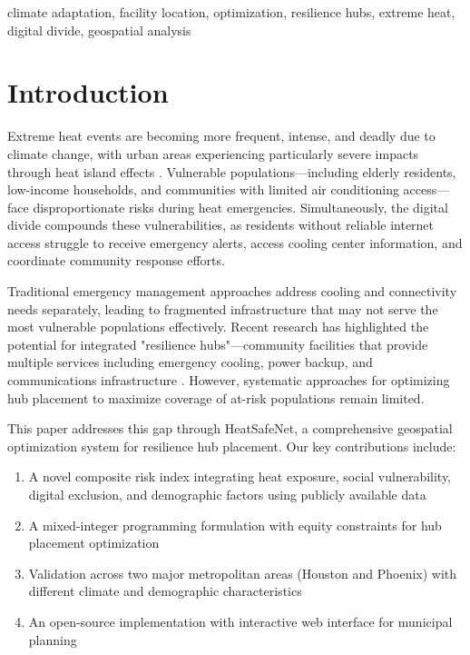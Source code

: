 \documentclass[conference]{IEEEtran}
\begin{document}
\begin{IEEEkeywords}
climate adaptation, facility location, optimization, resilience hubs, extreme heat, digital divide, geospatial analysis
\end{IEEEkeywords}

\section{Introduction}

Extreme heat events are becoming more frequent, intense, and deadly due to climate change, with urban areas experiencing particularly severe impacts through heat island effects \cite{ipcc2023}. Vulnerable populations—including elderly residents, low-income households, and communities with limited air conditioning access—face disproportionate risks during heat emergencies. Simultaneously, the digital divide compounds these vulnerabilities, as residents without reliable internet access struggle to receive emergency alerts, access cooling center information, and coordinate community response efforts.

Traditional emergency management approaches address cooling and connectivity needs separately, leading to fragmented infrastructure that may not serve the most vulnerable populations effectively. Recent research has highlighted the potential for integrated "resilience hubs"—community facilities that provide multiple services including emergency cooling, power backup, and communications infrastructure \cite{resilience2022}. However, systematic approaches for optimizing hub placement to maximize coverage of at-risk populations remain limited.

This paper addresses this gap through HeatSafeNet, a comprehensive geospatial optimization system for resilience hub placement. Our key contributions include:

\begin{enumerate}
\item A novel composite risk index integrating heat exposure, social vulnerability, digital exclusion, and demographic factors using publicly available data
\item A mixed-integer programming formulation with equity constraints for hub placement optimization
\item Validation across two major metropolitan areas (Houston and Phoenix) with different climate and demographic characteristics
\item An open-source implementation with interactive web interface for municipal planning
\end{enumerate}
\end{document}
